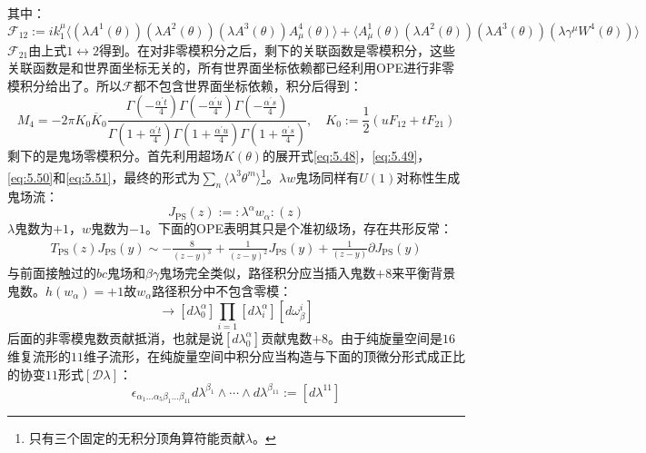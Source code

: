 其中：
\begin{equation}
	\mathcal{F}_{12} := i k_1^\mu \big\langle (\lambda A^1(\theta))(\lambda A^2(\theta))(\lambda A^3(\theta)) A_\mu^4(\theta) \big\rangle + \big\langle A_\mu^1(\theta) (\lambda A^2(\theta))(\lambda A^3(\theta))(\lambda \gamma^\mu W^4(\theta)) \big\rangle
\end{equation}
$\mathcal{F}_{21}$由上式$1\leftrightarrow 2$得到。在对非零模积分之后，剩下的关联函数是零模积分，这些关联函数是和世界面坐标无关的，所有世界面坐标依赖都已经利用OPE进行非零模积分给出了。所以$\mathcal{F}$都不包含世界面坐标依赖，积分后得到：
\begin{equation}
		M_4=-2\pi K_0\overline{K}_0\frac{\Gamma(-\frac{\alpha^{\prime}t}{4})\Gamma(-\frac{\alpha^{\prime}u}{4})\Gamma(-\frac{\alpha^{\prime}s}{4})}{\Gamma(1+\frac{\alpha^{\prime}t}{4})\Gamma(1+\frac{\alpha^{\prime}u}{4})\Gamma(1+\frac{\alpha^{\prime}s}{4})},\quad 
		K_0:=\frac{1}{2}(uF_{12}+tF_{21})
\end{equation}
剩下的是鬼场零模积分。首先利用超场$K(\theta)$的展开式\ref{eq:5.48}，\ref{eq:5.49}，\ref{eq:5.50}和\ref{eq:5.51}，最终的形式为$\sum_{n}\langle{\lambda^3\theta^m}\rangle$\footnote{只有三个固定的无积分顶角算符能贡献$\lambda$。}。$\lambda w$鬼场同样有$U(1)$对称性生成鬼场流：
\begin{equation}
	J_{\text{PS}}(z):=:\lambda^\alpha w_{\alpha}:(z)
\end{equation}
$\lambda$鬼数为$+1$，$w$鬼数为$-1$。下面的OPE表明其只是个准初级场，存在共形反常：
\begin{equation}
	\begin{aligned}
		T_{\text{PS}}(z)J_{\text{PS}}(y)\sim-\frac{8}{(z-y)^3}+\frac{1}{(z-y)^2}J_{\text{PS}}(y)+\frac{1}{(z-y)}\partial J_{\text{PS}}(y)
	\end{aligned}
\end{equation}
与前面接触过的$bc$鬼场和$\beta\gamma$鬼场完全类似，路径积分应当插入鬼数$+8$来平衡背景鬼数。$h(w_\alpha) = +1$故$w_\alpha$路径积分中不包含零模：
\begin{equation}
	[\mathcal{D}\lambda][\mathcal{D}\omega]\to[d\lambda_0^\alpha]\prod_{i=1}[d\lambda_i^\alpha][d\omega_\beta^i]
\end{equation}
后面的非零模鬼数贡献抵消，也就是说$[d\lambda_0^\alpha]$贡献鬼数$+8$。由于纯旋量空间是$16$维复流形的$11$维子流形，在纯旋量空间中积分应当构造与下面的顶微分形式成正比的协变$11$形式$[\mathcal{D}\lambda]$：
\begin{equation}
	\epsilon_{\alpha_1...\alpha_5\beta_1...\beta_{11}}d\lambda^{\beta_1}\wedge\cdots\wedge d\lambda^{\beta_{11}}:=[d\lambda^{11}]
\end{equation}
